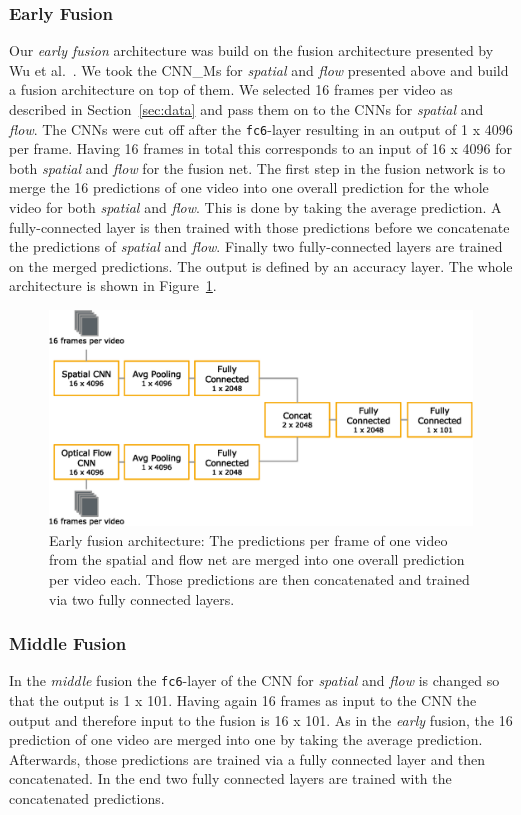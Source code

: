 \subsubsection{Early Fusion}
Our \emph{early fusion} architecture was build on the fusion architecture presented by Wu et al.~\cite{wu2015modeling}.
We took the CNN\_Ms for \emph{spatial} and \emph{flow} presented above and build a fusion architecture on top of them.
We selected 16 frames per video as described in Section~\ref{sec:data} and pass them on to the CNNs for \emph{spatial} and \emph{flow}.
The CNNs were cut off after the \texttt{fc6}-layer resulting in an output of 1 x 4096 per frame.
Having 16 frames in total this corresponds to an input of 16 x 4096 for both \emph{spatial} and \emph{flow} for the fusion net.
The first step in the fusion network is to merge the 16 predictions of one video into one overall prediction for the whole video for both \emph{spatial} and \emph{flow}.
This is done by taking the average prediction.
A fully-connected layer is then trained with those predictions before we concatenate the predictions of \emph{spatial} and \emph{flow}.
Finally two fully-connected layers are trained on the merged predictions.
The output is defined by an accuracy layer.
The whole architecture is shown in Figure~\ref{fig:early_fusion}.

\begin{figure}[!htb]
	\centering
	\includegraphics[scale=.7]{images/early_fusion.eps}
	\caption{Early fusion architecture: The predictions per frame of one video from the spatial and flow net are merged into one overall prediction per video each. Those predictions are then concatenated and trained via two fully connected layers.}
	\label{fig:early_fusion}
\end{figure}

\subsubsection{Middle Fusion}
In the \emph{middle} fusion the \texttt{fc6}-layer of the CNN for \emph{spatial} and \emph{flow} is changed so that the output is 1 x 101.
Having again 16 frames as input to the CNN the output and therefore input to the fusion is 16 x 101.
As in the \emph{early} fusion, the 16 prediction of one video are merged into one by taking the average prediction.
Afterwards, those predictions are trained via a fully connected layer and then concatenated.
In the end two fully connected layers are trained with the concatenated predictions.

